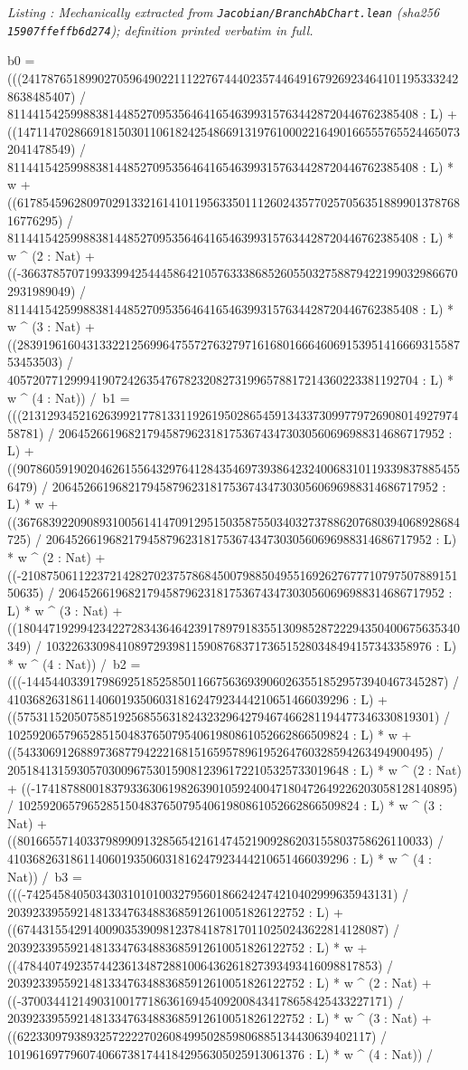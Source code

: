 \documentclass[a4paper,11pt]{article}
\newcounter{leanlisting}
\newenvironment{leanlisting}[2]{%
  \refstepcounter{leanlisting}\label{#2}%
  \begin{center}\textit{\small Listing \theleanlisting: #1}\end{center}%
  \Verbatim[breaklines=true,breakanywhere=true,fontsize=\footnotesize,frame=single,framesep=4pt,rulecolor=\color{gray!50},fillcolor=\color{gray!5}]%
}{%
  \endVerbatim%
}
\theoremstyle{plain}
\theoremstyle{definition}
\theoremstyle{remark}
\begin{document}
\begin{leanlisting}{Mechanically extracted from \texttt{Jacobian/BranchAbChart.lean} (sha256 \texttt{15907ffeffb6d274}); definition printed verbatim in full.}{ab:lst:def-chartclass}
      b0 = (((2417876518990270596490221112276744402357446491679269234641011953332428638485407) / 81144154259988381448527095356464165463993157634428720446762385408 : L) + ((14711470286691815030110618242548669131976100022164901665557655244650732041478549) / 81144154259988381448527095356464165463993157634428720446762385408 : L) * w + ((617854596280970291332161410119563350111260243577025705635188990137876816776295) / 81144154259988381448527095356464165463993157634428720446762385408 : L) * w ^ (2 : Nat) + ((-3663785707199339942544458642105763338685260550327588794221990329866702931989049) / 81144154259988381448527095356464165463993157634428720446762385408 : L) * w ^ (3 : Nat) + ((283919616043133221256996475572763279716168016664606915395141666931558753453503) / 40572077129994190724263547678232082731996578817214360223381192704 : L) * w ^ (4 : Nat)) /\
      b1 = (((21312934521626399217781331192619502865459134337309977972690801492797458781) / 2064526619682179458796231817536743473030560696988314686717952 : L) + ((90786059190204626155643297641284354697393864232400683101193398378854556479) / 2064526619682179458796231817536743473030560696988314686717952 : L) * w + ((3676839220908931005614147091295150358755034032737886207680394068928684725) / 2064526619682179458796231817536743473030560696988314686717952 : L) * w ^ (2 : Nat) + ((-21087506112237214282702375786845007988504955169262767771079750788915150635) / 2064526619682179458796231817536743473030560696988314686717952 : L) * w ^ (3 : Nat) + ((1804471929942342272834364642391789791835513098528722294350400675635340349) / 1032263309841089729398115908768371736515280348494157343358976 : L) * w ^ (4 : Nat)) /\
      b2 = (((-144544033917986925185258501166756369390602635518529573940467345287) / 410368263186114060193506031816247923444210651466039296 : L) + ((575311520507585192568556318243232964279467466281194477346330819301) / 102592065796528515048376507954061980861052662866509824 : L) * w + ((54330691268897368779422216815165957896195264760328594263494900495) / 205184131593057030096753015908123961722105325733019648 : L) * w ^ (2 : Nat) + ((-174187880018379336306198263901059240047180472649226203058128140895) / 102592065796528515048376507954061980861052662866509824 : L) * w ^ (3 : Nat) + ((80166557140337989909132856542161474521909286203155803758626110033) / 410368263186114060193506031816247923444210651466039296 : L) * w ^ (4 : Nat)) /\
      b3 = (((-7425458405034303101010032795601866242474210402999635943131) / 20392339559214813347634883685912610051826122752 : L) + ((6744315542914009035390981237841878170110250243622814128087) / 20392339559214813347634883685912610051826122752 : L) * w + ((478440749235744236134872881006436261827393493416098817853) / 20392339559214813347634883685912610051826122752 : L) * w ^ (2 : Nat) + ((-3700344121490310017718636169454092008434178658425433227171) / 20392339559214813347634883685912610051826122752 : L) * w ^ (3 : Nat) + ((62233097938932572222702608499502859806885134430639402117) / 10196169779607406673817441842956305025913061376 : L) * w ^ (4 : Nat)) /\

\end{leanlisting}
\end{document}
